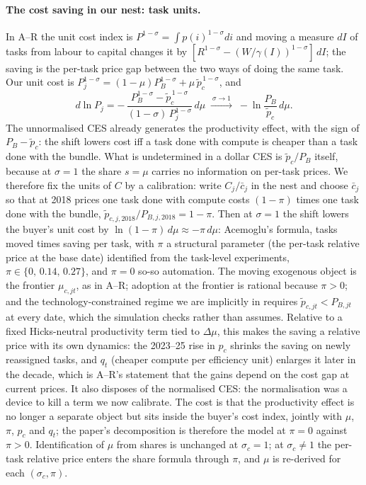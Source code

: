 \documentclass[11pt]{article}
\begin{document}
\paragraph{The cost saving in our nest: task units.} In A--R the unit cost index is $P^{1-\sigma}=\int p(i)^{1-\sigma}di$ and moving a measure $dI$ of tasks from labour to capital changes it by $[R^{1-\sigma}-(W/\gamma(I))^{1-\sigma}]\,dI$; the saving is the per-task price gap between the two ways of doing the same task. Our unit cost is $P_j^{1-\sigma}=(1-\mu)P_B^{1-\sigma}+\mu\,\tilde p_c^{\,1-\sigma}$, and
\[
d\ln P_j=-\,\frac{P_B^{1-\sigma}-\tilde p_c^{\,1-\sigma}}{(1-\sigma)\,P_j^{1-\sigma}}\,d\mu\;\xrightarrow{\ \sigma\to1\ }\;-\ln\!\frac{P_B}{\tilde p_c}\,d\mu .
\]
The unnormalised CES already generates the productivity effect, with the sign of $P_B-\tilde p_c$: the shift lowers cost iff a task done with compute is cheaper than a task done with the bundle. What is undetermined in a dollar CES is $\tilde p_c/P_B$ itself, because at $\sigma=1$ the share $s=\mu$ carries no information on per-task prices. We therefore fix the units of $C$ by a calibration: write $C_j/\bar c_j$ in the nest and choose $\bar c_j$ so that at 2018 prices one task done with compute costs $(1-\pi)$ times one task done with the bundle, $\tilde p_{c,j,2018}/P_{B,j,2018}=1-\pi$. Then at $\sigma=1$ the shift lowers the buyer's unit cost by $\ln(1-\pi)\,d\mu\approx-\pi\,d\mu$: Acemoglu's formula, tasks moved times saving per task, with $\pi$ a structural parameter (the per-task relative price at the base date) identified from the task-level experiments, $\pi\in\{0,\,0.14,\,0.27\}$, and $\pi=0$ so-so automation. The moving exogenous object is the frontier $\mu_{c,jt}$, as in A--R; adoption at the frontier is rational because $\pi>0$; and the technology-constrained regime we are implicitly in requires $\tilde p_{c,jt}<P_{B,jt}$ at every date, which the simulation checks rather than assumes. Relative to a fixed Hicks-neutral productivity term tied to $\Delta\mu$, this makes the saving a relative price with its own dynamics: the 2023--25 rise in $p_c$ shrinks the saving on newly reassigned tasks, and $q_t$ (cheaper compute per efficiency unit) enlarges it later in the decade, which is A--R's statement that the gains depend on the cost gap at current prices. It also disposes of the normalised CES: the normalisation was a device to kill a term we now calibrate. The cost is that the productivity effect is no longer a separate object but sits inside the buyer's cost index, jointly with $\mu$, $\pi$, $p_c$ and $q_t$; the paper's decomposition is therefore the model at $\pi=0$ against $\pi>0$. Identification of $\mu$ from shares is unchanged at $\sigma_c=1$; at $\sigma_c\neq1$ the per-task relative price enters the share formula through $\pi$, and $\mu$ is re-derived for each $(\sigma_c,\pi)$.
\end{document}
